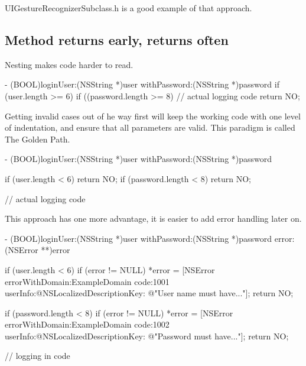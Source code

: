 \documentclass[10pt]{extarticle}
\newenvironment{codelisting}
{\footnotesize\mdframed[middlelinewidth=0.5pt, middlelinecolor=BaliHaiColor, skipabove=15pt]\verbatim}
{\endverbatim\endmdframed\vspace{12pt}\normalsize}
\newenvironment{tiplisting}
{\small\mdframed[middlelinewidth=0.5pt, middlelinecolor=GoldenDreamColor, skipabove=15pt]{\textbf{Tip:}}}
{\endmdframed\vspace{12pt}\normalsize}
\begin{document}
\begin{tiplisting}
UIGestureRecognizerSubclass.h is a good example of that approach.
\end{tiplisting}


\subsection{Method returns early, returns often}

Nesting makes code harder to read.

\begin{codelisting}
- (BOOL)loginUser:(NSString *)user withPassword:(NSString *)password
{
    if (user.length >= 6) {
        if ((password.length >= 8) {
            // actual logging code
        }
    }
    return NO;
}
\end{codelisting}

Getting invalid cases out of he way first will keep the working code with one level of indentation, and ensure that all parameters are valid. This paradigm is called The Golden Path.

\begin{codelisting}
- (BOOL)loginUser:(NSString *)user withPassword:(NSString *)password
{
    if (user.length < 6) return NO;
    if (password.length < 8) return NO;
    
    // actual logging code
}
\end{codelisting}

This approach has one more advantage, it is easier to add error handling later on.

\begin{codelisting}
- (BOOL)loginUser:(NSString *)user withPassword:(NSString *)password error:(NSError **)error
{
    if (user.length < 6) {
        if (error != NULL)
            *error = [NSError errorWithDomain:ExampleDomain
                                         code:1001
                                     userInfo:@{NSLocalizedDescriptionKey: @"User name must have..."}];
        return NO;
    }
    
    if (password.length < 8) {
        if (error != NULL)
            *error = [NSError errorWithDomain:ExampleDomain
                                         code:1002
                                     userInfo:@{NSLocalizedDescriptionKey: @"Password must have..."}];
        return NO;
    }
    
    // logging in code
}
\end{codelisting}
\end{document}
